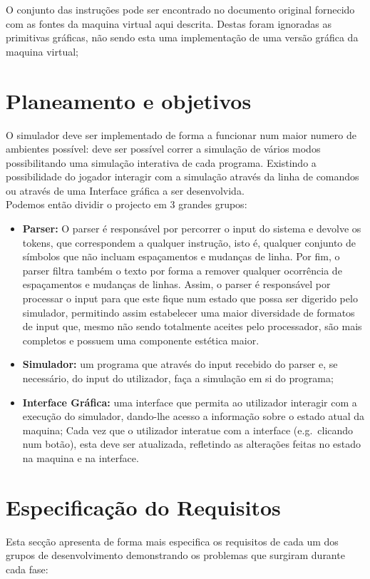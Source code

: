 \documentclass{report}
\begin{document}
\quad O conjunto das instruções pode ser encontrado no documento original fornecido com as fontes da maquina virtual aqui descrita.
Destas foram ignoradas as primitivas gráficas, não sendo esta uma implementação de uma versão gráfica da maquina virtual;

\section{Planeamento e objetivos}
\quad O simulador deve ser implementado de forma a funcionar num maior numero de ambientes possível:
deve ser possível correr a simulação de vários modos possibilitando uma simulação interativa de cada programa.
Existindo a possibilidade do jogador interagir com a simulação através da linha de comandos ou através de uma Interface
gráfica a ser desenvolvida.\\
\null\quad Podemos então dividir o projecto em 3 grandes grupos:
\begin{itemize}
	\item \textbf{Parser:} O parser é responsável por percorrer o input do sistema e devolve
	os tokens, que correspondem a qualquer instrução, isto é, qualquer conjunto de símbolos que não incluam
	espaçamentos e mudanças de linha.
	\quad Por fim, o parser filtra também o texto por forma a remover qualquer ocorrência de espaçamentos e mudanças de linhas.
	Assim, o parser é responsável por processar o input para que este fique num estado que possa ser digerido pelo simulador,
	permitindo assim estabelecer uma maior diversidade de formatos de input que, mesmo não sendo totalmente aceites
	pelo processador, são mais completos e possuem uma componente estética maior.


	\item \textbf{Simulador:} um programa que através do input recebido do parser e, se necessário, do input do utilizador,
	faça a simulação em si do programa;

	\item \textbf{Interface Gráfica:} uma interface que permita ao utilizador interagir com a execução do simulador,
  dando-lhe acesso a informação sobre o estado atual da maquina;
	Cada vez que o utilizador interatue com a interface (e.g.\ clicando num botão), esta deve ser atualizada,
	refletindo as alterações feitas no estado na maquina e na interface.
\end{itemize}

\section{Especificação do Requisitos}
\quad Esta secção apresenta de forma mais especifica os requisitos de cada um dos grupos de desenvolvimento demonstrando os problemas que
surgiram durante cada fase:
\end{document}
